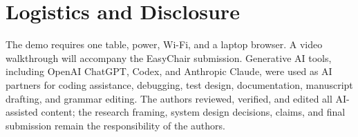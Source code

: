 \documentclass[manuscript,screen]{acmart}
\begin{document}
\section{Logistics and Disclosure}

The demo requires one table, power, Wi-Fi, and a laptop browser. A video
walkthrough will accompany the EasyChair submission. Generative AI tools,
including OpenAI ChatGPT, Codex, and Anthropic Claude, were used as AI
partners for coding assistance, debugging, test design, documentation,
manuscript drafting, and grammar editing. The authors reviewed, verified, and
edited all AI-assisted content; the research framing, system design decisions,
claims, and final submission remain the responsibility of the authors.
\end{document}
